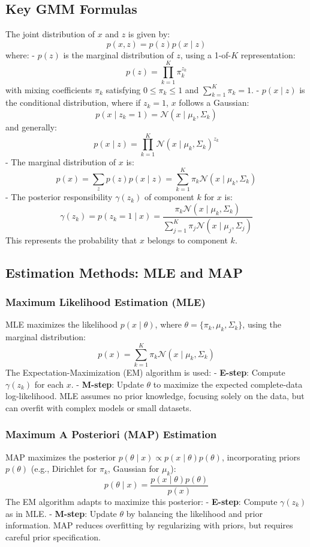 \documentclass[12pt]{article}
\numberwithin{equation}{section}
\begin{document}
\subsection{Key GMM Formulas}
The joint distribution of \(x\) and \(z\) is given by:
\[
p(x, z) = p(z) p(x \mid z)
\]
where:
- \(p(z)\) is the marginal distribution of \(z\), using a 1-of-\(K\) representation:
  \[
  p(z) = \prod_{k=1}^{K} \pi_k^{z_k}
  \]
  with mixing coefficients \(\pi_k\) satisfying \(0 \leq \pi_k \leq 1\) and \(\sum_{k=1}^{K} \pi_k = 1\).
- \(p(x \mid z)\) is the conditional distribution, where if \(z_k = 1\), \(x\) follows a Gaussian:
  \[
  p(x \mid z_k = 1) = \mathcal{N}(x \mid \mu_k, \Sigma_k)
  \]
  and generally:
  \[
  p(x \mid z) = \prod_{k=1}^{K} \mathcal{N}(x \mid \mu_k, \Sigma_k)^{z_k}
  \]
- The marginal distribution of \(x\) is:
  \[
  p(x) = \sum_{z} p(z) p(x \mid z) = \sum_{k=1}^{K} \pi_k \mathcal{N}(x \mid \mu_k, \Sigma_k)
  \]
- The posterior responsibility \(\gamma(z_k)\) of component \(k\) for \(x\) is:
  \[
  \gamma(z_k) = p(z_k = 1 \mid x) = \frac{\pi_k \mathcal{N}(x \mid \mu_k, \Sigma_k)}{\sum_{j=1}^{K} \pi_j \mathcal{N}(x \mid \mu_j, \Sigma_j)}
  \]
  This represents the probability that \(x\) belongs to component \(k\).

\subsection{Estimation Methods: MLE and MAP}

\subsubsection{Maximum Likelihood Estimation (MLE)}
MLE maximizes the likelihood \(p(x \mid \theta)\), where \(\theta = \{\pi_k, \mu_k, \Sigma_k\}\), using the marginal distribution:
\[
p(x) = \sum_{k=1}^{K} \pi_k \mathcal{N}(x \mid \mu_k, \Sigma_k)
\]
The Expectation-Maximization (EM) algorithm is used:
- \textbf{E-step}: Compute \(\gamma(z_k)\) for each \(x\).
- \textbf{M-step}: Update \(\theta\) to maximize the expected complete-data log-likelihood.
MLE assumes no prior knowledge, focusing solely on the data, but can overfit with complex models or small datasets.

\subsubsection{Maximum A Posteriori (MAP) Estimation}
MAP maximizes the posterior \(p(\theta \mid x) \propto p(x \mid \theta) p(\theta)\), incorporating priors \(p(\theta)\) (e.g., Dirichlet for \(\pi_k\), Gaussian for \(\mu_k\)):
\[
p(\theta \mid x) = \frac{p(x \mid \theta) p(\theta)}{p(x)}
\]
The EM algorithm adapts to maximize this posterior:
- \textbf{E-step}: Compute \(\gamma(z_k)\) as in MLE.
- \textbf{M-step}: Update \(\theta\) by balancing the likelihood and prior information.
MAP reduces overfitting by regularizing with priors, but requires careful prior specification.
\end{document}
